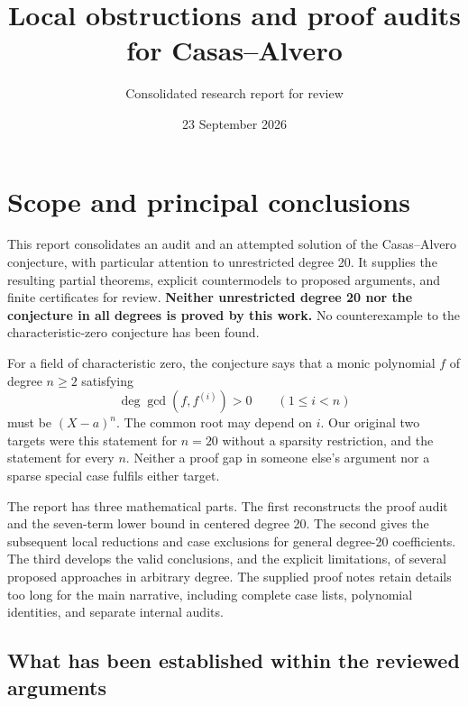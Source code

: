 \documentclass[
  british,
  10pt,
]{article}
\title{Local obstructions and proof audits for Casas--Alvero}
\subtitle{Consolidated research report for review}
\author{}
\date{23 September 2026}
\begin{document}
\maketitle

{
\setcounter{tocdepth}{3}
\tableofcontents
}
\section{Scope and principal
conclusions}\label{scope-and-principal-conclusions}

This report consolidates an audit and an attempted solution of the
Casas--Alvero conjecture, with particular attention to unrestricted
degree 20. It supplies the resulting partial theorems, explicit
countermodels to proposed arguments, and finite certificates for review.
\textbf{Neither unrestricted degree 20 nor the conjecture in all degrees
is proved by this work.} No counterexample to the characteristic-zero
conjecture has been found.

For a field of characteristic zero, the conjecture says that a monic
polynomial \(f\) of degree \(n\geq2\) satisfying
\[\deg\gcd(f,f^{(i)})>0\qquad(1\leq i<n)\] must be \((X-a)^n\). The
common root may depend on \(i\). Our original two targets were this
statement for \(n=20\) without a sparsity restriction, and the statement
for every \(n\). Neither a proof gap in someone else's argument nor a
sparse special case fulfils either target.

The report has three mathematical parts. The first reconstructs the
proof audit and the seven-term lower bound in centered degree 20. The
second gives the subsequent local reductions and case exclusions for
general degree-20 coefficients. The third develops the valid
conclusions, and the explicit limitations, of several proposed
approaches in arbitrary degree. The supplied proof notes retain details
too long for the main narrative, including complete case lists,
polynomial identities, and separate internal audits.

\subsection{What has been established within the reviewed
arguments}\label{what-has-been-established-within-the-reviewed-arguments}
\end{document}
